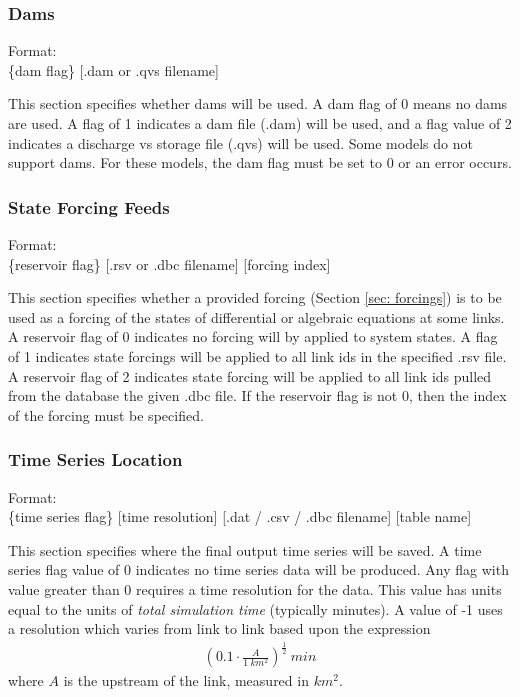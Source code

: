 \documentclass[12pt]{article}
\newenvironment{codeindent}
{\begin{list}{}
        {\setlength{\leftmargin}{.1in}}
        \item[]
}
{\end{list}}
\begin{document}
\subsubsection{Dams} \label{sec: dams}

\begin{codeindent}
 Format: \\
 \{dam flag\} [.dam or .qvs filename]
\end{codeindent}

This section specifies whether dams will be used. A dam flag of 0 means no dams are used. A flag of 1 indicates a dam file (.dam) will be used, and a flag value of 2 indicates a discharge vs storage file (.qvs) will be used. Some models do not support dams. For these models, the dam flag must be set to 0 or an error occurs.

\subsubsection{State Forcing Feeds} \label{sec: state forcing feeds}

\begin{codeindent}
 Format: \\
 \{reservoir flag\} [.rsv or .dbc filename] [forcing index]
\end{codeindent}

This section specifies whether a provided forcing (Section \ref{sec: forcings}) is to be used as a forcing of the states of differential or algebraic equations at some links. A reservoir flag of 0 indicates no forcing will by applied to system states. A flag of 1 indicates state forcings will be applied to all link ids in the specified .rsv file. A reservoir flag of 2 indicates state forcing will be applied to all link ids pulled from the database the given .dbc file. If the reservoir flag is not 0, then the index of the forcing must be specified.


\subsubsection{Time Series Location} \label{sec: time series location}

\begin{codeindent}
 Format: \\
 \{time series flag\} [time resolution] [.dat / .csv / .dbc filename] [table name]
\end{codeindent}

This section specifies where the final output time series will be saved. A time series flag value of 0 indicates no time series data will be produced. Any flag with value greater than 0 requires a time resolution for the data. This value has units equal to the units of \textit{total simulation time} (typically minutes). A value of -1 uses a resolution which varies from link to link based upon the expression
\begin{align}
 \left(0.1 \cdot \frac{A}{1 \ km^2} \right)^{\frac{1}{2}} \ min
\end{align}
where $A$ is the upstream of the link, measured in $km^2$.
\end{document}
